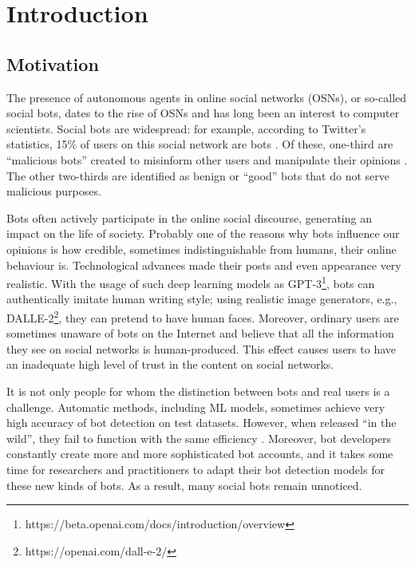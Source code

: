 \chapter{Introduction}
\label{ch:introduction}

% 


\section{Motivation}

The presence of autonomous agents in online social networks (OSNs), or so-called social bots, dates to the rise of OSNs and has long been an interest to computer scientists. Social bots are widespread: for example, according to Twitter’s statistics, 15\% of users on this social network are bots \cite{twitterBots}. Of these, one-third are ``malicious bots'' created to misinform other users and manipulate their opinions \cite{twitterBots}. The other two-thirds are identified as benign or ``good'' bots that do not serve malicious purposes.

Bots often actively participate in the online social discourse, generating an impact on the life of society. Probably one of the reasons why bots influence our opinions is how credible, sometimes indistinguishable from humans, their online behaviour is. Technological advances made their posts and even appearance very realistic. With the usage of such deep learning models as GPT-3\footnote{https://beta.openai.com/docs/introduction/overview}, bots can authentically imitate human writing style; using realistic image generators, e.g., DALLE-2\footnote{https://openai.com/dall-e-2/}, they can pretend to have human faces. Moreover, ordinary users are sometimes unaware of bots on the Internet and believe that all the information they see on social networks is human-produced. This effect causes users to have an inadequate high level of trust in the content on social networks.

It is not only people for whom the distinction between bots and real users is a challenge. Automatic methods, including ML models, sometimes achieve very high accuracy of bot detection on test datasets. However, when released ``in the wild'', they fail to function with the same efficiency \cite{Cresci2020}. Moreover, bot developers constantly create more and more sophisticated bot accounts, and it takes some time for researchers and practitioners to adapt their bot detection models for these new kinds of bots. As a result, many social bots remain unnoticed.

